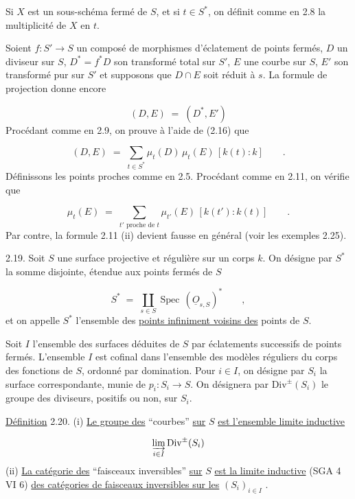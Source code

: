 Si $X$ est un sous-schéma fermé de $S$, et si $t \in S^*$, on définit comme en 2.8 la multiplicité de $X$ en $t$.

Soient $f : S' \longrightarrow S$ un composé de morphismes d'éclatement de points fermés, $D$ un diviseur sur $S$, $D^* = f^* D$ son transformé total sur $S'$,
$E$ une courbe sur $S$, $E'$ son transformé pur sur $S'$ et supposons que $D \cap E$ soit réduit à $s$. La formule de projection donne encore

\begin{equation}\tag{2.16}
(D,E) \;=\; (D^*,E')
\end{equation}
Procédant comme en 2.9, on prouve à l'aide de (2.16) que

\begin{equation}\tag{2.17}
(D,E) \;=\; \sum_{t \in S^*} \mu_t(D) \, \mu_t(E) \, [k(t) : k] \qquad .
\end{equation}
Définissons les points proches comme en 2.5. Procédant comme en 2.11, on vérifie que

\begin{equation}\tag{2.18}
\mu_t(E) \;=\; \sum_{t' \text{ proche de } t} \mu_{t'}(E) \, [k(t') : k(t)] \qquad .
\end{equation}
Par contre, la formule 2.11 (ii) devient fausse en général (voir les exemples 2.25).

2.19. Soit $S$ une surface projective et régulière sur un corps $k$. On désigne par $S^*$ la somme disjointe, étendue aux points fermés de $S$

\begin{equation*}
S^* \;=\; \coprod_{s \in S} \operatorname{Spec} \, (\underline{O}_{s,S})^* \qquad ,
\end{equation*}
et on appelle $S^*$ l'ensemble des \underline{points infiniment voisins des} points de $S$.

Soit $I$ l'ensemble des surfaces déduites de $S$ par éclatements successifs de points fermés. L'ensemble $I$ est cofinal dans l'ensemble des modèles réguliers du corps des fonctions de $S$, ordonné par domination. Pour $i \in I$, on désigne par $S_i$ la surface correspondante, munie de $p_i : S_i \to S$. On désignera par $\mathrm{Div}^{\pm}(S_i)$ le groupe des diviseurs, positifs ou non, sur $S_i$.

\underline{Définition} 2.20. (i) \underline{Le groupe des} ``courbes'' \underline{sur} $S$ \underline{est l'ensemble limite inductive}

\begin{equation*}
\varinjlim_{i \in I} \mathrm{Div}^{\pm}(S_i)
\end{equation*}
(ii) \underline{La catégorie des} ``faisceaux inversibles'' \underline{sur} $S$ \underline{est la limite inductive}
(SGA 4 VI 6) \underline{des catégories de faisceaux inversibles sur les} $(S_i)_{i \in I}$ .

